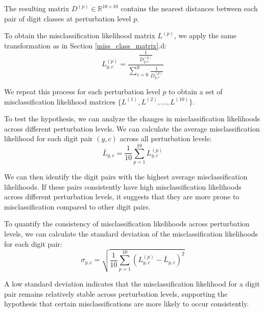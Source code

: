 The resulting matrix $D^{(p)} \in \mathbb{R}^{10 \times 10}$ contains the nearest distances between each pair of digit classes at perturbation level $p$.

To obtain the misclassification likelihood matrix $L^{(p)}$, we apply the same transformation as in Section \ref{miss_class_matrix}.d:
\begin{equation}
L^{(p)}_{y,c} = \frac{\frac{1}{D^{(p)}_{y,c}}}{\sum\limits_{c=0}^9 \frac{1}{D^{(p)}_{y,c}}}    
\end{equation}

We repeat this process for each perturbation level $p$ to obtain a set of misclassification likelihood matrices $\{L^{(1)}, L^{(2)}, ..., L^{(10)}\}$.

To test the hypothesis, we can analyze the changes in misclassification likelihoods across different perturbation levels. We can calculate the average misclassification likelihood for each digit pair $(y, c)$ across all perturbation levels:
\begin{equation}
\bar{L}_{y,c} = \frac{1}{10} \sum_{p=1}^{10} L^{(p)}_{y,c}    
\end{equation}

We can then identify the digit pairs with the highest average misclassification likelihoods. If these pairs consistently have high misclassification likelihoods across different perturbation levels, it suggests that they are more prone to misclassification compared to other digit pairs.

To quantify the consistency of misclassification likelihoods across perturbation levels, we can calculate the standard deviation of the misclassification likelihoods for each digit pair:
\begin{equation}
\sigma_{y,c} = \sqrt{\frac{1}{10} \sum_{p=1}^{10} (L^{(p)}_{y,c} - \bar{L}_{y,c})^2}    
\end{equation}

A low standard deviation indicates that the misclassification likelihood for a digit pair remains relatively stable across perturbation levels, supporting the hypothesis that certain misclassifications are more likely to occur consistently.
